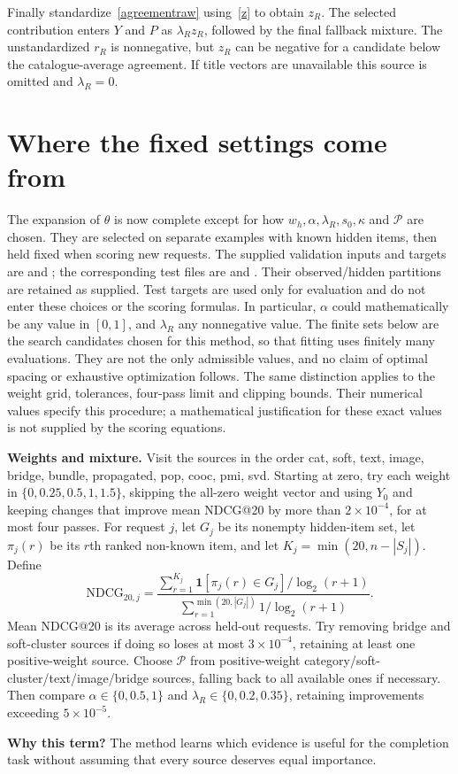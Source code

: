 \documentclass[11pt,a4paper]{article}
\newcommand{\why}{\par\textbf{Why this term?} }
\numberwithin{equation}{section}
\begin{document}
Finally standardize~\eqref{agreementraw} using~\eqref{z} to obtain $z_R$.
The selected contribution enters $Y$ and $P$ as $\lambda_Rz_R$, followed by
the final fallback mixture. The unstandardized $r_R$ is nonnegative, but
$z_R$ can be negative for a candidate below the catalogue-average agreement.
If title vectors are unavailable this source is omitted and $\lambda_R=0$.

\section{Where the fixed settings come from}
The expansion of $\theta$ is now complete except for how $w_h,\alpha,\lambda_R,s_0,\kappa$ and
$\mathcal P$ are chosen. They are selected on separate examples with known hidden items,
then held fixed when scoring new requests. The supplied validation inputs and targets are  and
; the corresponding test files are
 and . Their observed/hidden
partitions are retained as supplied. Test targets are used only for evaluation
and do not enter these choices or the scoring formulas. In particular, $\alpha$ could mathematically be any value in
$[0,1]$, and $\lambda_R$ any nonnegative value. The finite sets below are the search candidates
chosen for this method, so that fitting uses finitely many evaluations. They are not the
only admissible values, and no claim of optimal spacing or exhaustive optimization follows.
The same distinction applies to the weight grid, tolerances, four-pass limit and clipping
bounds. Their numerical values specify this procedure; a mathematical justification for
these exact values is not supplied by the scoring equations.

\textbf{Weights and mixture.} Visit the sources in the order
cat, soft, text, image, bridge, bundle, propagated, pop, cooc, pmi, svd. Starting at zero,
try each weight in $\{0,0.25,0.5,1,1.5\}$, skipping the all-zero weight vector and using $Y_0$ and keeping changes that improve
mean NDCG@20 by more than $2\times10^{-4}$, for at most four passes. For request $j$, let $G_j$ be its nonempty hidden-item set, let $\pi_j(r)$ be its
$r$th ranked non-known item, and let $K_j=\min(20,n-|S_j|)$. Define
\[
\mathrm{NDCG}_{20,j}=\frac{\sum_{r=1}^{K_j}\mathbf1[\pi_j(r)\in G_j]/\log_2(r+1)}
{\sum_{r=1}^{\min(20,|G_j|)}1/\log_2(r+1)}.
\]
Mean NDCG@20 is its average across held-out requests.
Try removing bridge and soft-cluster sources if doing so loses at most $3\times10^{-4}$, retaining at least one positive-weight source.
Choose $\mathcal P$ from positive-weight category/soft-cluster/text/image/bridge sources,
falling back to all available ones if necessary. Then compare $\alpha\in\{0,0.5,1\}$ and
$\lambda_R\in\{0,0.2,0.35\}$, retaining improvements exceeding $5\times10^{-5}$.
\why The method learns which evidence is useful for the completion task without assuming
that every source deserves equal importance.
\end{document}
